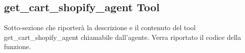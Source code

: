 \subsection{get\_cart\_shopify\_agent Tool}

Sotto-sezione che riporterà la descrizione e il contenuto del tool get\_cart\_shopify\_agent chiamabile dall'agente.
Verra riportato il codice della funzione.

